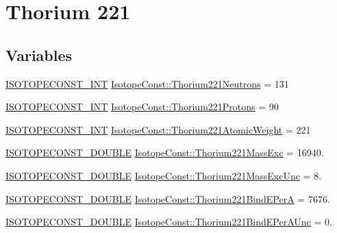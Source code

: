 \hypertarget{group___isotope_const-_thorium-_th221}{}\section{Thorium 221}
\label{group___isotope_const-_thorium-_th221}
\subsection*{Variables}
\begin{DoxyCompactItemize}
\item 
\mbox{\hyperlink{group___isotope_const-_macros_ga5f18360b3e99483a35c32d789e62621c}{I\+S\+O\+T\+O\+P\+E\+C\+O\+N\+S\+T\+\_\+\+I\+NT}} \mbox{\hyperlink{group___isotope_const-_thorium-_th221_ga111623f307c9415fbc4229be749dba63}{Isotope\+Const\+::\+Thorium221\+Neutrons}} = 131
\item 
\mbox{\hyperlink{group___isotope_const-_macros_ga5f18360b3e99483a35c32d789e62621c}{I\+S\+O\+T\+O\+P\+E\+C\+O\+N\+S\+T\+\_\+\+I\+NT}} \mbox{\hyperlink{group___isotope_const-_thorium-_th221_gab544c6546d8d74cd81eab7b5e9940d87}{Isotope\+Const\+::\+Thorium221\+Protons}} = 90
\item 
\mbox{\hyperlink{group___isotope_const-_macros_ga5f18360b3e99483a35c32d789e62621c}{I\+S\+O\+T\+O\+P\+E\+C\+O\+N\+S\+T\+\_\+\+I\+NT}} \mbox{\hyperlink{group___isotope_const-_thorium-_th221_gaaa384b776670aa3d7b4084a3afe44df9}{Isotope\+Const\+::\+Thorium221\+Atomic\+Weight}} = 221
\item 
\mbox{\hyperlink{group___isotope_const-_macros_ga8f45a7272ce02c0b4c65c44636ed719a}{I\+S\+O\+T\+O\+P\+E\+C\+O\+N\+S\+T\+\_\+\+D\+O\+U\+B\+LE}} \mbox{\hyperlink{group___isotope_const-_thorium-_th221_ga0a4a3d7901fde00b03f41519f055cfaf}{Isotope\+Const\+::\+Thorium221\+Mass\+Exc}} = 16940.
\item 
\mbox{\hyperlink{group___isotope_const-_macros_ga8f45a7272ce02c0b4c65c44636ed719a}{I\+S\+O\+T\+O\+P\+E\+C\+O\+N\+S\+T\+\_\+\+D\+O\+U\+B\+LE}} \mbox{\hyperlink{group___isotope_const-_thorium-_th221_ga5dac61788bb5156e59d0ef80743ae3b7}{Isotope\+Const\+::\+Thorium221\+Mass\+Exc\+Unc}} = 8.
\item 
\mbox{\hyperlink{group___isotope_const-_macros_ga8f45a7272ce02c0b4c65c44636ed719a}{I\+S\+O\+T\+O\+P\+E\+C\+O\+N\+S\+T\+\_\+\+D\+O\+U\+B\+LE}} \mbox{\hyperlink{group___isotope_const-_thorium-_th221_gaa716a011dfdd7685ee943f96cb94aeed}{Isotope\+Const\+::\+Thorium221\+Bind\+E\+PerA}} = 7676.
\item 
\mbox{\hyperlink{group___isotope_const-_macros_ga8f45a7272ce02c0b4c65c44636ed719a}{I\+S\+O\+T\+O\+P\+E\+C\+O\+N\+S\+T\+\_\+\+D\+O\+U\+B\+LE}} \mbox{\hyperlink{group___isotope_const-_thorium-_th221_ga750e7b940b042b3b4da674a7c6b7bf1c}{Isotope\+Const\+::\+Thorium221\+Bind\+E\+Per\+A\+Unc}} = 0.

\end{DoxyCompactItemize}
